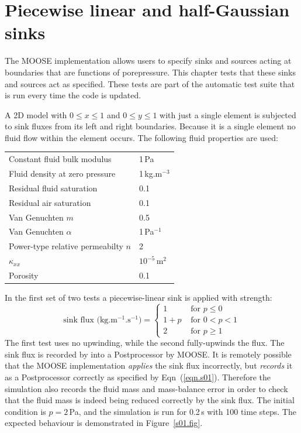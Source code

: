 \documentclass[]{scrreprt}
\begin{document}
\chapter{Piecewise linear and half-Gaussian sinks}
\label{si}

The MOOSE implementation allows users to specify sinks and sources
acting at boundaries that are functions of porepressure.  This chapter
tests that these sinks and sources act as specified.  These tests are
part of the automatic test suite that is run every time the code is
updated.

A 2D model with $0\leq x \leq 1$ and $0\leq y \leq 1$ with just a
single element is subjected to sink fluxes from its left and right
boundaries.  Because it is a single element no fluid flow within the
element occurs.  The following fluid properties are used:
\begin{center}
\begin{tabular}{|ll|}
\hline
Constant fluid bulk modulus & 1\,Pa \\
Fluid density at zero pressure & 1\,kg.m$^{-3}$ \\
Residual fluid saturation & 0.1 \\
Residual air saturation & 0.1 \\
Van Genuchten $m$ & 0.5 \\
Van Genuchten $\alpha$ & 1\,Pa$^{-1}$ \\
Power-type relative permeabilty $n$ & 2 \\
$\kappa_{xx}$ & $10^{-5}$\,m$^{2}$ \\
Porosity & 0.1 \\
\hline
\end{tabular} 
\end{center}

\noindent In the first set of two tests a piecewise-linear sink is applied with strength:
\begin{equation}
\mbox{sink flux (kg.m$^{-1}$.s$^{-1}$)} = \left\{
\begin{array}{ll}
1 & \mbox{ for } p \leq 0 \\
1+p & \mbox{ for } 0<p<1 \\
2 & \mbox{ for } p\geq 1 
\end{array}
\right.
\label{eqn.s01}
\end{equation}
The first test uses no upwinding, while the second fully-upwinds the flux.
The sink flux is recorded by into a Postprocessor by MOOSE.  It is
remotely possible that the MOOSE implementation {\em applies} the sink
flux incorrectly, but {\em records} it as a Postprocessor correctly as
specified by Eqn~(\ref{eqn.s01}).  Therefore the simulation also
records the fluid mass and mass-balance error in order to check that
the fluid mass is indeed being reduced correctly by the sink flux.
The initial condition is $p=2$\,Pa, and the simulation is run for
0.2\,s with 100 time steps.  The expected behaviour is demonstrated in
Figure~\ref{s01.fig}.
\end{document}
